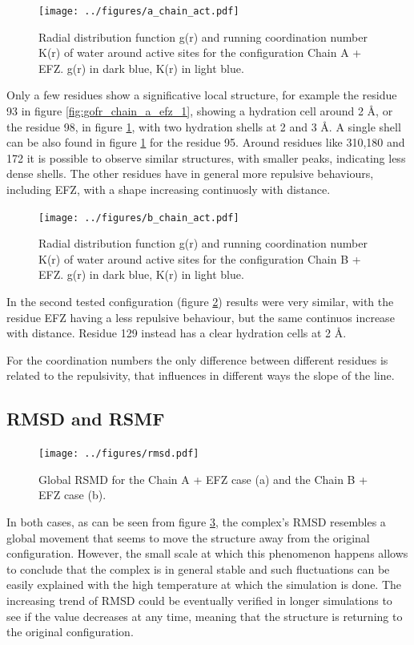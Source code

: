 \documentclass[12pt]{article}
\begin{document}
\begin{figure}
    \centering
    \texttt{[image: ../figures/a\_chain\_act.pdf]}
    \caption{Radial distribution function g(r) and running coordination number K(r) of water around active sites for the configuration Chain A + EFZ. g(r) in dark blue, K(r) in light blue.\label{fig:gofr_chain_a_efz_2}}
\end{figure}
Only a few residues show a significative local structure, for example the residue 93 in figure \ref{fig:gofr_chain_a_efz_1}, showing a hydration cell around
2 \AA, or the residue 98, in figure \ref{fig:gofr_chain_a_efz_2}, with two hydration shells at 2 and 3 \AA. A single shell can be also found in figure \ref{fig:gofr_chain_a_efz_2} for the residue 95.
Around residues like 310,180 and 172 it is possible to observe similar structures, with smaller peaks, indicating less dense shells. The other residues have in general more repulsive behaviours, including EFZ, with a shape increasing continuosly with distance.

\begin{figure}[H]
    \centering
    \texttt{[image: ../figures/b\_chain\_act.pdf]}
    \caption{Radial distribution function g(r) and running coordination number K(r) of water around active sites for the configuration Chain B + EFZ. g(r) in dark blue, K(r) in light blue.\label{fig:gofr_chain_b_efz}}
\end{figure}

In the second tested configuration (figure \ref{fig:gofr_chain_b_efz}) results were very similar, with the residue EFZ having a less repulsive behaviour, but the same continuos increase with distance. Residue 129 instead has a clear hydration cells at 2 \AA. 

For the coordination numbers the only difference between different residues is related to the repulsivity, that influences in different ways the slope of the line.

\subsection{RMSD and RSMF}
\begin{figure}[H]
    \centering
    \texttt{[image: ../figures/rmsd.pdf]}
    \caption{Global RSMD for the Chain A + EFZ case (a) and the Chain B + EFZ case (b).\label{fig:rmsd}}
\end{figure}
In both cases, as can be seen from figure \ref{fig:rmsd}, the complex's RMSD resembles a global movement that seems to move the structure away from the original configuration. However, the small scale at which this phenomenon happens allows to conclude that the complex is in general stable and such fluctuations can be easily explained with the high temperature at which the simulation is done. The increasing trend of RMSD could be eventually verified in longer simulations to see if the value decreases at any time, meaning that the structure is returning to the original configuration.
\end{document}
